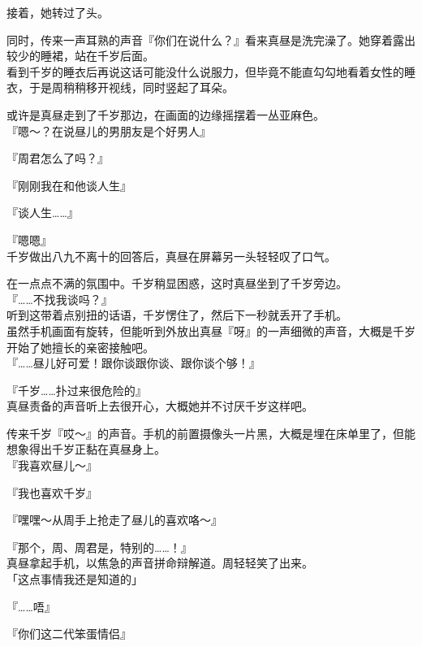 接着，她转过了头。

同时，传来一声耳熟的声音『你们在说什么？』看来真昼是洗完澡了。她穿着露出较少的睡裙，站在千岁后面。\\

看到千岁的睡衣后再说这话可能没什么说服力，但毕竟不能直勾勾地看着女性的睡衣，于是周稍稍移开视线，同时竖起了耳朵。

或许是真昼走到了千岁那边，在画面的边缘摇摆着一丛亚麻色。\\

『嗯～？在说昼儿的男朋友是个好男人』

『周君怎么了吗？』

『刚刚我在和他谈人生』

『谈人生……』

『嗯嗯』\\

千岁做出八九不离十的回答后，真昼在屏幕另一头轻轻叹了口气。

在一点点不满的氛围中。千岁稍显困惑，这时真昼坐到了千岁旁边。\\

『……不找我谈吗？』\\

听到这带着点别扭的话语，千岁愣住了，然后下一秒就丢开了手机。\\

虽然手机画面有旋转，但能听到外放出真昼『呀』的一声细微的声音，大概是千岁开始了她擅长的亲密接触吧。\\

『……昼儿好可爱！跟你谈跟你谈、跟你谈个够！』

『千岁……扑过来很危险的』\\

真昼责备的声音听上去很开心，大概她并不讨厌千岁这样吧。

传来千岁『哎～』的声音。手机的前置摄像头一片黑，大概是埋在床单里了，但能想象得出千岁正黏在真昼身上。\\

『我喜欢昼儿～』

『我也喜欢千岁』

『嘿嘿～从周手上抢走了昼儿的喜欢咯～』

『那个，周、周君是，特别的……！』\\

真昼拿起手机，以焦急的声音拼命辩解道。周轻轻笑了出来。\\

「这点事情我还是知道的」

『……唔』

『你们这二代笨蛋情侣』


